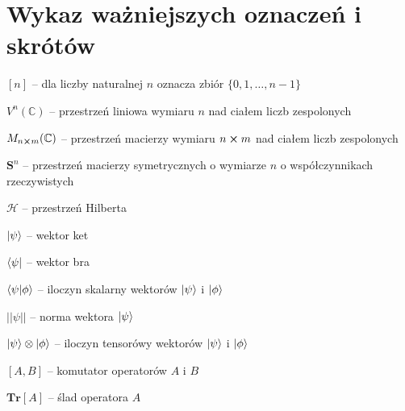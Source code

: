 \section*{Wykaz ważniejszych oznaczeń i skrótów}

$[n]$ -- dla liczby naturalnej $n$ oznacza zbiór $\{0, 1, \ldots, n - 1\}$

$V^{n}(\mathbb{C})$ -- przestrzeń liniowa wymiaru $n$ nad ciałem liczb zespolonych

$M_{n \boldsymbol\times m}(\mathbb{C})$ -- przestrzeń macierzy wymiaru $n \boldsymbol\times m$ nad ciałem liczb zespolonych

$\textbf{S} ^ {n}$ -- przestrzeń macierzy symetrycznych o wymiarze $n$ o współczynnikach rzeczywistych

$\mathcal{H}$ -- przestrzeń Hilberta

$\ket{\psi}$ -- wektor ket

$\bra{\psi}$ -- wektor bra

$\bra{\psi}\ket{\phi}$ -- iloczyn skalarny wektorów $\ket{\psi}$ i $\ket{\phi}$

$||\psi||$ -- norma wektora $\ket{\psi}$

$\ket{\psi} \otimes \ket{\phi}$ -- iloczyn tensorówy wektorów $\ket{\psi}$ i $\ket{\phi}$

$[A, B]$ -- komutator operatorów $A$ i $B$

$\textbf{Tr}[A]$ -- ślad operatora $A$
